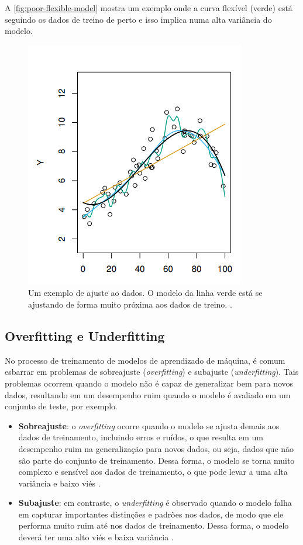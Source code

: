 \begin{itemize}
    A \autoref{fig:poor-flexible-model} mostra um exemplo onde a curva flexível (verde) está seguindo os dados de treino de perto e isso implica numa alta variância do modelo.

    \begin{figure}[h]
        \centering
        \includegraphics[width=0.5\linewidth]{figs/poor-flexible-model.png}
        \caption{Um exemplo de ajuste ao dados. O modelo da linha verde está se ajustando de forma muito próxima aos dados de treino. \cite{James2000}.}
        \label{fig:poor-flexible-model}
    \end{figure}
\end{itemize}

\subsection{Overfitting e Underfitting}

No processo de treinamento de modelos de aprendizado de máquina, é comum esbarrar em problemas de sobreajuste (\textit{overfitting}) e subajuste (\textit{underfitting}). Tais problemas ocorrem quando o modelo não é capaz de generalizar bem para novos dados, resultando em um desempenho ruim quando o modelo é avaliado em um conjunto de teste, por exemplo.

\begin{itemize}
    \item \textbf{Sobreajuste}: o \textit{overfitting} ocorre quando o modelo se ajusta demais aos dados de treinamento, incluindo erros e ruídos, o que resulta em um desempenho ruim na generalização para novos dados, ou seja, dados que não são parte do conjunto de treinamento. Dessa forma, o modelo se torna muito complexo e sensível aos dados de treinamento, o que pode levar a uma alta variância e baixo viés \citep{Hastie2009}.
    
    \item \textbf{Subajuste}: em contraste, o \textit{underfitting} é observado quando o modelo falha em capturar importantes distinções e padrões nos dados, de modo que ele performa muito ruim até nos dados de treinamento. Dessa forma, o modelo deverá ter uma alto viés e baixa variância \citep{Hastie2009}.
\end{itemize}

